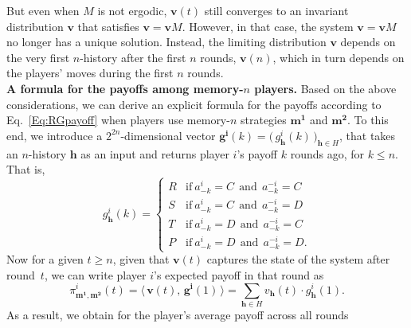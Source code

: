 \documentclass[11pt]{article}
\theoremstyle{plainCl1}
\theoremstyle{plainCl2}
\begin{document}
But even when $M$ is not ergodic, $\mathbf{v}(t)$ still converges to an invariant distribution $\mathbf{v}$ that satisfies $\mathbf{v} \!=\! \mathbf{v}M$.
However, in that case, the system  $\mathbf{v} \!=\! \mathbf{v}M$ no longer has a unique solution. 
Instead, the limiting distribution $\mathbf{v}$ depends on the very first $n$-history after the first $n$ rounds, $\mathbf{v}(n)$, which in turn depends on the players' moves during the first $n$ rounds.\\ 


\noindent
{\bf A formula for the payoffs among memory-$n$ players.} Based on the above considerations, we can derive an explicit formula for the payoffs according to Eq.~\eqref{Eq:RGpayoff} when players use memory-$n$ strategies $\mathbf{m^1}$ and $\mathbf{m^2}$. 
To this end, we introduce a $2^{2n}$-dimensional vector $\mathbf{g^i}(k)\!=\!\big(\,g^i_\mathbf{h}(k)\,\big)_{\mathbf{h}\in H}$, that takes an $n$-history $\mathbf{h}$ as an input and returns player $i$'s payoff $k$ rounds ago, for $k\!\le\!n$. 
That is, 
\begin{equation}\label{Eq:g(k)}
    g_\mathbf{h}^i(k) = \left\{
    \begin{array}{cl}
    R	&\text{if}~ a_{-k}^i\!=\!C~~\text{and}~~a_{-k}^{-i}\!=\!C\\[0.1cm]
    S	&\text{if}~ a_{-k}^i\!=\!C~~\text{and}~~ a_{-k}^{-i}\!=\!D\\[0.1cm]
    T	&\text{if}~ a_{-k}^i\!=\!D~~\text{and}~~ a_{-k}^{-i}\!=\!C\\[0.1cm]
    P	&\text{if}~ a_{-k}^i\!=\!D~~\text{and}~~ a_{-k}^{-i}\!=\!D.
    \end{array}
    \right.
\end{equation}
Now for a given $t\!\ge\!n$, given that  $\mathbf{v}(t)$ captures the state of the system after round~$t$, we can write player $i$'s expected payoff in that round as
\begin{equation} \label{Eq:ExpPayRound}
\pi^i_{\mathbf{m^1},\mathbf{m^2}}(t) = \big\langle \,\mathbf{v}(t),\, \mathbf{g^i}(1)\,\big\rangle = \sum_{\mathbf{h}\in H} v_\mathbf{h}(t) \cdot g^i_\mathbf{h}(1). 
\end{equation}
As a result, we obtain for the player's average payoff across all rounds
\end{document}
